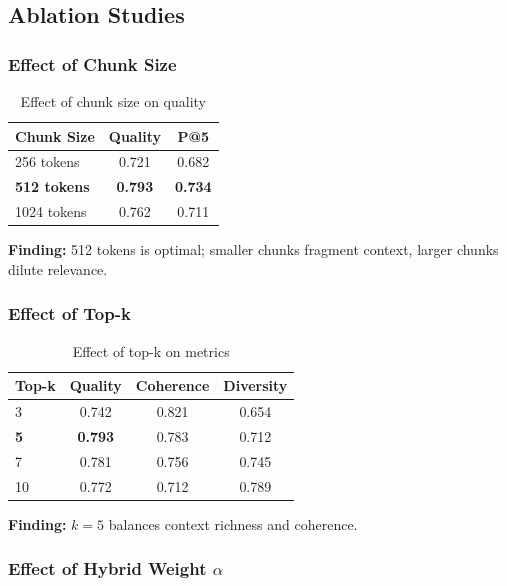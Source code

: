 \documentclass[11pt,a4paper]{article}
\begin{document}
\subsection{Ablation Studies}

\subsubsection{Effect of Chunk Size}

\begin{table}[h]
\centering
\small
\begin{tabular}{lcc}
\toprule
\textbf{Chunk Size} & \textbf{Quality} & \textbf{P@5} \\
\midrule
256 tokens & 0.721 & 0.682 \\
\textbf{512 tokens} & \textbf{0.793} & \textbf{0.734} \\
1024 tokens & 0.762 & 0.711 \\
\bottomrule
\end{tabular}
\caption{Effect of chunk size on quality}
\label{tab:chunk_ablation}
\end{table}

\textbf{Finding:} 512 tokens is optimal; smaller chunks fragment context, larger chunks dilute relevance.

\subsubsection{Effect of Top-k}

\begin{table}[h]
\centering
\small
\begin{tabular}{lccc}
\toprule
\textbf{Top-k} & \textbf{Quality} & \textbf{Coherence} & \textbf{Diversity} \\
\midrule
3 & 0.742 & 0.821 & 0.654 \\
\textbf{5} & \textbf{0.793} & 0.783 & 0.712 \\
7 & 0.781 & 0.756 & 0.745 \\
10 & 0.772 & 0.712 & 0.789 \\
\bottomrule
\end{tabular}
\caption{Effect of top-k on metrics}
\label{tab:topk_ablation}
\end{table}

\textbf{Finding:} $k=5$ balances context richness and coherence.

\subsubsection{Effect of Hybrid Weight $\alpha$}
\end{document}
